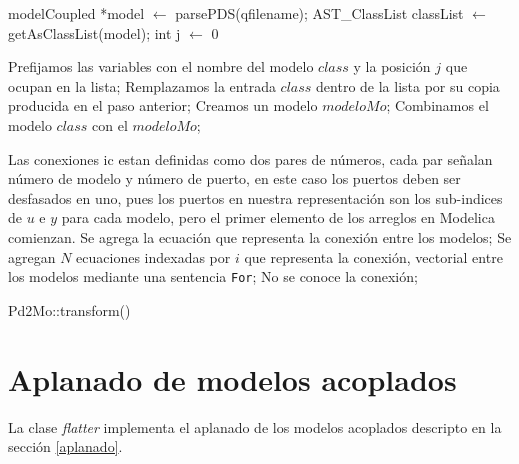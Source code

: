 \begin{algorithm}[H]
\begin{algorithmic}[1]
\State modelCoupled *model $\gets$ parsePDS(qfilename);
\State AST\_ClassList classList $\gets$ getAsClassList(model); 
\State int j $\gets$ 0\;

 		\State Prefijamos las variables con el nombre del modelo $class$ y la posición $j$ que ocupan en la lista;
 		\State Remplazamos la entrada $class$ dentro de la lista por su copia producida en el paso anterior;
 	\EndIf
\EndFor
\State Creamos un modelo $modeloMo$;
 	\State Combinamos el modelo $class$ con el $modeloMo$;
\EndFor

	\State Las conexiones ic estan definidas como dos pares de números, cada par señalan número  de modelo y número de puerto, en este caso los puertos deben ser desfasados en uno, pues los puertos en nuestra representación son los sub-indices de $u$ e $y$ para cada modelo, pero el primer elemento de los arreglos en Modelica comienzan.
  		\State Se agrega la ecuación que representa la conexión entre los modelos;
  		\State Se agregan $N$ ecuaciones indexadas por $i$ que representa la conexión, vectorial entre los modelos mediante una sentencia \texttt{For};
  	\Else
  		\State No se conoce la conexión;
	\EndIf
\EndFor
\end{algorithmic}
 \caption{Pd2Mo::transform()}
\end{algorithm}

\section{Aplanado de modelos acoplados} 
La clase \emph{flatter} implementa el aplanado de los modelos acoplados descripto en la sección \ref{aplanado}.
 

